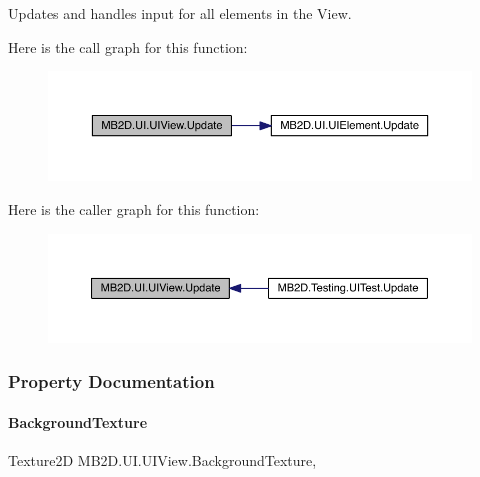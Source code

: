 Updates and handles input for all elements in the View. 

Here is the call graph for this function\+:
\nopagebreak
\begin{figure}[H]
\begin{center}
\leavevmode
\includegraphics[width=350pt]{class_m_b2_d_1_1_u_i_1_1_u_i_view_a5628b6cd853a0f419eb8ac62958f62bb_cgraph}
\end{center}
\end{figure}
Here is the caller graph for this function\+:
\nopagebreak
\begin{figure}[H]
\begin{center}
\leavevmode
\includegraphics[width=350pt]{class_m_b2_d_1_1_u_i_1_1_u_i_view_a5628b6cd853a0f419eb8ac62958f62bb_icgraph}
\end{center}
\end{figure}


\subsubsection{Property Documentation}
\hypertarget{class_m_b2_d_1_1_u_i_1_1_u_i_view_a9d5bf0c4239df5a79429921bda80a1ad}{}\label{class_m_b2_d_1_1_u_i_1_1_u_i_view_a9d5bf0c4239df5a79429921bda80a1ad} 
\paragraph{\texorpdfstring{Background\+Texture}{BackgroundTexture}}
{\footnotesize\ttfamily Texture2D M\+B2\+D.\+U\+I.\+U\+I\+View.\+Background\+Texture\hspace{0.3cm}{\ttfamily [get]}, {\ttfamily [set]}}



